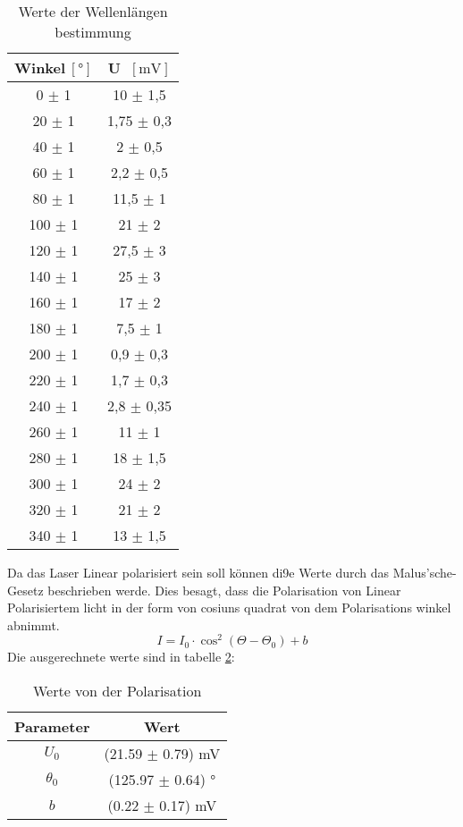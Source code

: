 \begin{table}[htbp]
    \centering
    \begin{tabular}{c|c}
        Winkel\(~[\text{°}]\) & U \(~[\text{mV}]\) \\
        \hline
        0 \(\pm\) 1 & 10 \(\pm\) 1,5 \\
        20 \(\pm\) 1 & 1,75 \(\pm\) 0,3 \\
        40 \(\pm\) 1 & 2 \(\pm\) 0,5 \\
        60 \(\pm\) 1 & 2,2 \(\pm\) 0,5 \\
        80 \(\pm\) 1 & 11,5 \(\pm\) 1 \\
        100 \(\pm\) 1 & 21 \(\pm\) 2 \\
        120 \(\pm\) 1 & 27,5 \(\pm\) 3 \\
        140 \(\pm\) 1 & 25 \(\pm\) 3 \\
        160 \(\pm\) 1 & 17 \(\pm\) 2 \\
        180 \(\pm\) 1 & 7,5 \(\pm\) 1 \\
        200 \(\pm\) 1 & 0,9 \(\pm\) 0,3 \\
        220 \(\pm\) 1 & 1,7 \(\pm\) 0,3 \\
        240 \(\pm\) 1 & 2,8 \(\pm\) 0,35 \\
        260 \(\pm\) 1 & 11 \(\pm\) 1 \\
        280 \(\pm\) 1 & 18 \(\pm\) 1,5 \\
        300 \(\pm\) 1 & 24 \(\pm\) 2 \\
        320 \(\pm\) 1 & 21 \(\pm\) 2 \\
        340 \(\pm\) 1 & 13 \(\pm\) 1,5 \\
    \end{tabular}
    \caption{Werte der Wellenlängen bestimmung}
    \label{tab:Wellen}
\end{table}

Da das Laser Linear polarisiert sein soll können di9e Werte durch das Malus'sche-Gesetz beschrieben werde. 
Dies besagt, dass die Polarisation von Linear Polarisiertem licht in der form von cosiuns quadrat von dem Polarisations winkel abnimmt.
\begin{equation*}
    I = I_0 \cdot \cos^2(\Theta -\Theta_0) + b
\end{equation*}
Die ausgerechnete werte sind in tabelle \ref{tab:WertePol}:

\begin{table}[htbp]
    \centering
    \begin{tabular}{c|c}
        Parameter & Wert \\
        \hline
        $U_0$ & (21.59 \(\pm\) 0.79) mV \\
        $\theta_0$ & (125.97 \(\pm\) 0.64) ° \\
        $b$ & (0.22 \(\pm\) 0.17) mV \\
    \end{tabular}
    \caption{Werte von der Polarisation}
    \label{tab:WertePol}
\end{table}

